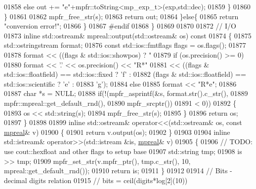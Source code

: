 \begin{DoxyCode}
{01858                 \textcolor{keywordflow}{else}       out += \textcolor{stringliteral}{"e"}+mpfr::toString<mp\_exp\_t>(exp,std::dec);
01859             \}
01860         \}
01861 
01862         mpfr\_free\_str(s);
01863         \textcolor{keywordflow}{return} out;
01864     \}\textcolor{keywordflow}{else}\{
01865         \textcolor{keywordflow}{return} \textcolor{stringliteral}{"conversion error!"};
01866     \}
01867 \textcolor{preprocessor}{#endif}
01868 \}
01869 
01870 
01872 \textcolor{comment}{// I/O}
01873 \textcolor{keyword}{inline} std::ostream& mpreal::output(std::ostream& os)\textcolor{keyword}{ const}
01874 \textcolor{keyword}{}\{
01875     std::ostringstream format;
01876     \textcolor{keyword}{const} std::ios::fmtflags flags = os.flags();
01877 
01878     format << ((flags & std::ios::showpos) ? \textcolor{stringliteral}{"%
01879     \textcolor{keywordflow}{if} (os.precision() >= 0)
01880         format << \textcolor{charliteral}{'.'} << os.precision() << \textcolor{stringliteral}{"R*"}
01881                << ((flags & std::ios::floatfield) == std::ios::fixed ? \textcolor{charliteral}{'f'} :
01882                    (flags & std::ios::floatfield) == std::ios::scientific ? \textcolor{charliteral}{'e'} :
01883                    \textcolor{charliteral}{'g'});
01884     \textcolor{keywordflow}{else}
01885         format << \textcolor{stringliteral}{"R*e"};
01886 
01887     \textcolor{keywordtype}{char} *s = NULL;
01888     \textcolor{keywordflow}{if}(!(mpfr\_asprintf(&s, format.str().c\_str(),
01889                         mpfr::mpreal::get\_default\_rnd(),
01890                         mpfr\_srcptr())
01891         < 0))
01892     \{
01893         os << std::string(s);
01894         mpfr\_free\_str(s);
01895     \}
01896     \textcolor{keywordflow}{return} os;
01897 \}
01898 
01899 \textcolor{keyword}{inline} std::ostream& operator<<(std::ostream& os, \textcolor{keyword}{const} \hyperlink{classmpfr_1_1mpreal}{mpreal}& v)
01900 \{
01901     \textcolor{keywordflow}{return} v.output(os);
01902 \}
01903 
01904 \textcolor{keyword}{inline} std::istream& operator>>(std::istream &is, \hyperlink{classmpfr_1_1mpreal}{mpreal}& v)
01905 \{
01906     \textcolor{comment}{// TODO: use cout::hexfloat and other flags to setup base}
01907     std::string tmp;
01908     is >> tmp;
01909     mpfr\_set\_str(v.mpfr\_ptr(), tmp.c\_str(), 10, mpreal::get\_default\_rnd());
01910     \textcolor{keywordflow}{return} is;
01911 \}
01912 
01914 \textcolor{comment}{//     Bits - decimal digits relation}
01915 \textcolor{comment}{//        bits   = ceil(digits*log[2](10))}
}}
\end{DoxyCode}

